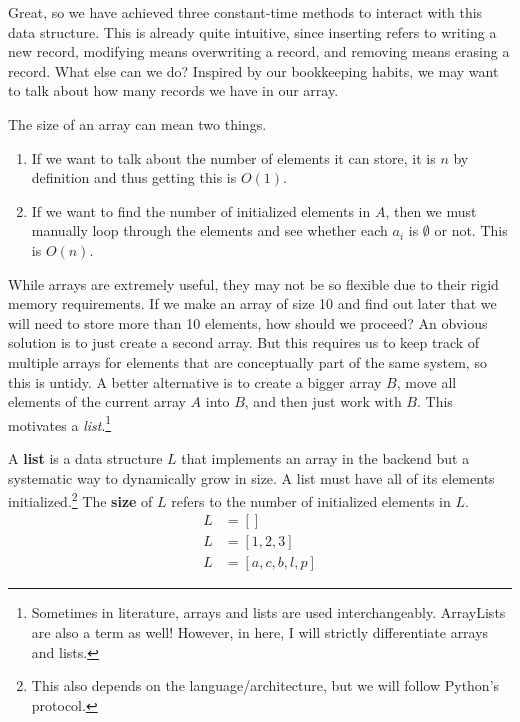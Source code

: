  Great, so we have achieved three constant-time methods to interact with this data structure. This is already quite intuitive, since inserting refers to writing a new record, modifying means overwriting a record, and removing means erasing a record. What else can we do? Inspired by our bookkeeping habits, we may want to talk about how many records we have in our array. 

  \begin{algo}
    The size of an array can mean two things. 
    \begin{enumerate}
      \item If we want to talk about the number of elements it can store, it is $n$ by definition and thus getting this is $O(1)$. 
      \item If we want to find the number of initialized elements in $A$, then we must manually loop through the elements and see whether each $a_i$ is $\emptyset$ or not. This is $O(n)$. 
    \end{enumerate} 
  \end{algo} 

  While arrays are extremely useful, they may not be so flexible due to their rigid memory requirements. If we make an array of size 10 and find out later that we will need to store more than 10 elements, how should we proceed? An obvious solution is to just create a second array. But this requires us to keep track of multiple arrays for elements that are conceptually part of the same system, so this is untidy. A better alternative is to create a bigger array $B$, move all elements of the current array $A$ into $B$, and then just work with $B$. This motivates a \textit{list}.\footnote{Sometimes in literature, arrays and lists are used interchangeably. ArrayLists are also a term as well! However, in here, I will strictly differentiate arrays and lists.} 

  \begin{definition}[List]
    A \textbf{list} is a data structure $L$ that implements an array in the backend but a systematic way to dynamically grow in size. A list must have all of its elements initialized.\footnote{This also depends on the language/architecture, but we will follow Python's protocol.} The \textbf{size} of $L$ refers to the number of initialized elements in $L$.
    \begin{align}
      L & = [] \\
      L & = [1, 2, 3] \\
      L & = [a, c, b, l, p]
    \end{align}
  \end{definition} 

